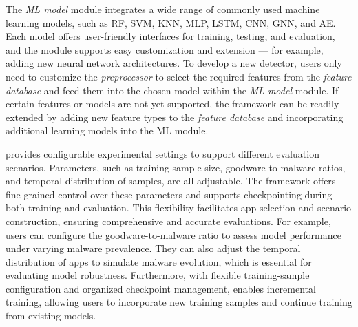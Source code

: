 The \textit{ML model} module integrates a wide range of commonly used machine learning models, such as RF, SVM, KNN, MLP, LSTM, CNN, GNN, and AE.
Each model offers user-friendly interfaces for training, testing, and evaluation, and the module supports easy customization and extension --- for example, adding new neural network architectures.
To develop a new detector, users only need to customize the \textit{preprocessor} to select the required features from the \textit{feature database} and feed them into the chosen model within the \textit{ML model} module.
If certain features or models are not yet supported, the framework can be readily extended by adding new feature types to the \textit{feature database} and incorporating additional learning models into the ML module.


\codename provides configurable experimental settings to support different evaluation scenarios.
Parameters, such as training sample size, goodware-to-malware ratios, and temporal distribution of samples, are all adjustable.
The framework offers fine-grained control over these parameters and supports checkpointing during both training and evaluation.
This flexibility facilitates app selection and scenario construction, ensuring comprehensive and accurate evaluations.
For example, users can configure the goodware-to-malware ratio to assess model performance under varying malware prevalence.
They can also adjust the temporal distribution of apps to simulate malware evolution, which is essential for evaluating model robustness.
Furthermore, with flexible training-sample configuration and organized checkpoint management, \codename enables incremental training, allowing users to incorporate new training samples and continue training from existing models.



